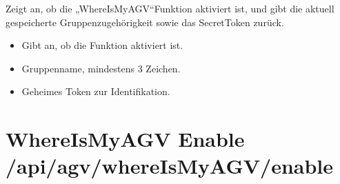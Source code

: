 \documentclass[letterpaper,10pt,english]{sphinxmanual}
\begin{document}
\sphinxAtStartPar
{}
Zeigt an, ob die „WhereIsMyAGV“\sphinxhyphen{}Funktion aktiviert ist, und gibt die aktuell gespeicherte Gruppenzugehörigkeit
sowie das Secret\sphinxhyphen{}Token zurück.

\sphinxAtStartPar
{}

\begin{sphinxVerbatim}[commandchars=\\\{\}]
\end{sphinxVerbatim}

\sphinxAtStartPar
{}
\begin{itemize}
\item {} 
\sphinxAtStartPar
{}  \textendash{} Gibt an, ob die Funktion aktiviert ist.

\item {} 
\sphinxAtStartPar
{}  \textendash{} Gruppenname, mindestens 3 Zeichen.

\item {} 
\sphinxAtStartPar
{}  \textendash{} Geheimes Token zur Identifikation.

\end{itemize}


\section{WhereIsMyAGV Enable \textendash{} /api/agv/whereIsMyAGV/enable}
\label{\detokenize{agv_rest_api_wima:whereismyagv-enable-api-agv-whereismyagv-enable}}\label{\detokenize{agv_rest_api_wima:post-api-agv-wima-enable}}
\end{document}
